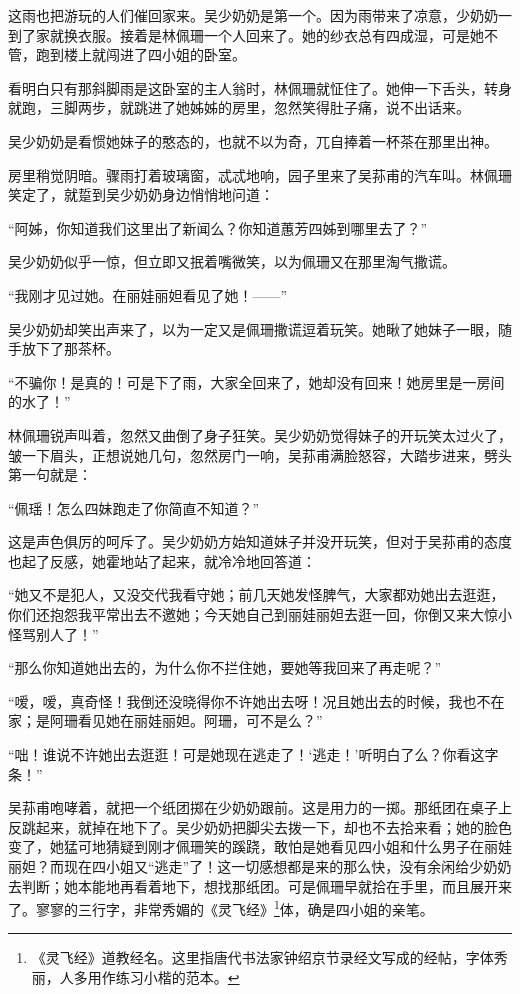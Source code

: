 \par 这雨也把游玩的人们催回家来。吴少奶奶是第一个。因为雨带来了凉意，少奶奶一到了家就换衣服。接着是林佩珊一个人回来了。她的纱衣总有四成湿，可是她不管，跑到楼上就闯进了四小姐的卧室。
\par 看明白只有那斜脚雨是这卧室的主人翁时，林佩珊就怔住了。她伸一下舌头，转身就跑，三脚两步，就跳进了她姊姊的房里，忽然笑得肚子痛，说不出话来。
\par 吴少奶奶是看惯她妹子的憨态的，也就不以为奇，兀自捧着一杯茶在那里出神。
\par 房里稍觉阴暗。骤雨打着玻璃窗，忒忒地响，园子里来了吴荪甫的汽车叫。林佩珊笑定了，就踅到吴少奶奶身边悄悄地问道：
\par “阿姊，你知道我们这里出了新闻么？你知道蕙芳四姊到哪里去了？”
\par 吴少奶奶似乎一惊，但立即又抿着嘴微笑，以为佩珊又在那里淘气撒谎。
\par “我刚才见过她。在丽娃丽妲看见了她！——”
\par 吴少奶奶却笑出声来了，以为一定又是佩珊撒谎逗着玩笑。她瞅了她妹子一眼，随手放下了那茶杯。
\par “不骗你！是真的！可是下了雨，大家全回来了，她却没有回来！她房里是一房间的水了！”
\par 林佩珊锐声叫着，忽然又曲倒了身子狂笑。吴少奶奶觉得妹子的开玩笑太过火了，皱一下眉头，正想说她几句，忽然房门一响，吴荪甫满脸怒容，大踏步进来，劈头第一句就是：
\par “佩瑶！怎么四妹跑走了你简直不知道？”
\par 这是声色俱厉的呵斥了。吴少奶奶方始知道妹子并没开玩笑，但对于吴荪甫的态度也起了反感，她霍地站了起来，就冷冷地回答道：
\par “她又不是犯人，又没交代我看守她；前几天她发怪脾气，大家都劝她出去逛逛，你们还抱怨我平常出去不邀她；今天她自己到丽娃丽妲去逛一回，你倒又来大惊小怪骂别人了！”
\par “那么你知道她出去的，为什么你不拦住她，要她等我回来了再走呢？”
\par “嗳，嗳，真奇怪！我倒还没晓得你不许她出去呀！况且她出去的时候，我也不在家；是阿珊看见她在丽娃丽妲。阿珊，可不是么？”
\par “咄！谁说不许她出去逛逛！可是她现在逃走了！‘逃走！’听明白了么？你看这字条！”
\par 吴荪甫咆哮着，就把一个纸团掷在少奶奶跟前。这是用力的一掷。那纸团在桌子上反跳起来，就掉在地下了。吴少奶奶把脚尖去拨一下，却也不去拾来看；她的脸色变了，她猛可地猜疑到刚才佩珊笑的蹊跷，敢怕是她看见四小姐和什么男子在丽娃丽妲？而现在四小姐又“逃走”了！这一切感想都是来的那么快，没有余闲给少奶奶去判断；她本能地再看着地下，想找那纸团。可是佩珊早就拾在手里，而且展开来了。寥寥的三行字，非常秀媚的《灵飞经》\footnote{《灵飞经》道教经名。这里指唐代书法家钟绍京节录经文写成的经帖，字体秀丽，人多用作练习小楷的范本。}体，确是四小姐的亲笔。
